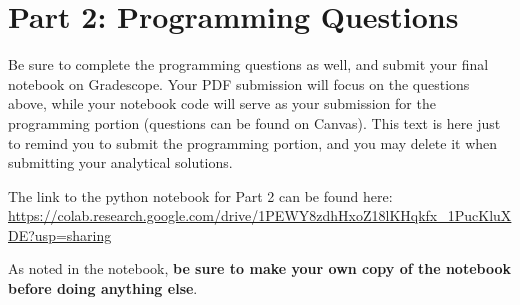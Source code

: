 \documentclass[11pt,addpoints,answers]{exam}
\begin{document}
\newpage
\section*{Part 2: Programming Questions}

Be sure to complete the programming questions as well, and submit your final notebook on Gradescope.  Your PDF submission will focus on the questions above, while your notebook code will serve as your submission for the programming portion (questions can be found on Canvas).  This text is here just to remind you to submit the programming portion, and you may delete it when submitting your analytical solutions.

The link to the python notebook for Part 2 can be found here: \url{https://colab.research.google.com/drive/1PEWY8zdhHxoZ18lKHqkfx_1PucKluXDE?usp=sharing}

As noted in the notebook, \textbf{be sure to make your own copy of the notebook before doing anything else}.
\end{document}
